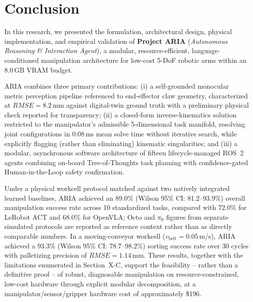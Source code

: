 \documentclass[journal]{IEEEtran}
\begin{document}
\section{Conclusion}
In this research, we presented the formulation, architectural design, physical implementation, and empirical validation of \textbf{Project ARIA} (\textit{Autonomous Reasoning \& Interaction Agent}), a modular, resource-efficient, language-conditioned manipulation architecture for low-cost 5-DoF robotic arms within an 8.0\,GB VRAM budget.

ARIA combines three primary contributions: (i) a self-grounded monocular metric perception pipeline referenced to end-effector claw geometry, characterized at $RMSE = 8.2$\,mm against digital-twin ground truth with a preliminary physical check reported for transparency; (ii) a closed-form inverse-kinematics solution restricted to the manipulator's admissible 5-dimensional task manifold, resolving joint configurations in $0.08$\,ms mean solve time without iterative search, while explicitly flagging (rather than eliminating) kinematic singularities; and (iii) a modular, asynchronous software architecture of fifteen lifecycle-managed ROS~2 agents combining on-board Tree-of-Thoughts task planning with confidence-gated Human-in-the-Loop safety confirmation.

Under a physical workcell protocol matched against two natively integrated learned baselines, ARIA achieved an $89.0\%$ (Wilson 95\% CI: 81.2--93.9\%) overall manipulation success rate across 10 standardized tasks, compared with $72.0\%$ for LeRobot ACT and $68.0\%$ for OpenVLA; Octo and $\pi_0$ figures from separate simulated protocols are reported as reference context rather than as directly comparable numbers. In a moving-conveyor workcell ($v_{\text{belt}} = 0.05$\,m/s), ARIA achieved a $93.3\%$ (Wilson 95\% CI: 78.7--98.2\%) sorting success rate over 30 cycles with palletizing precision of $RMSE = 1.14$\,mm. These results, together with the limitations enumerated in Section~X-C, support the feasibility -- rather than a definitive proof -- of robust, diagnosable manipulation on resource-constrained, low-cost hardware through explicit modular decomposition, at a manipulator/sensor/gripper hardware cost of approximately \$196.

\end{document}
